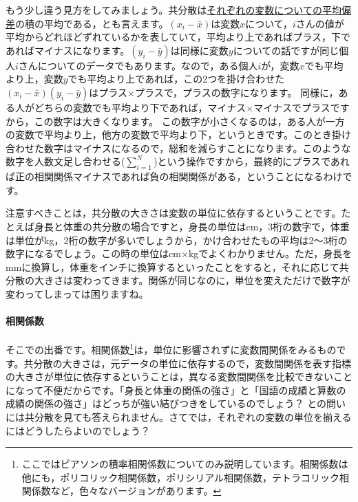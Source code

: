 \documentclass{ltjsbook}
\begin{document}
もう少し違う見方をしてみましょう。共分散は\uline{それぞれの変数についての平均偏差}の積の平均である，とも言えます。$(x_i - \bar{x})$は変数$x$について，$i$さんの値が平均からどれほどずれているかを表していて，平均より上であればプラス，下であればマイナスになります。$(y_i - \bar{y})$は同様に変数$y$についての話ですが同じ個人$i$さんについてのデータでもあります。なので，ある個人$i$が，変数$x$でも平均より上，変数$y$でも平均より上であれば，この2つを掛け合わせた$(x_i - \bar{x})(y_i - \bar{y})$はプラス$\times$プラスで，プラスの数字になります。
同様に，ある人がどちらの変数でも平均より下であれば，マイナス$\times$マイナスでプラスですから，この数字は大きくなります。
この数字が小さくなるのは，ある人が一方の変数で平均より上，他方の変数で平均より下，というときです。このとき掛け合わせた数字はマイナスになるので，総和を減らすことになります。このような数字を人数文足し合わせる($\sum_{i=1}^N$)という操作ですから，最終的にプラスであれば正の相関関係マイナスであれば負の相関関係がある，ということになるわけです。

注意すべきことは，共分散の大きさは変数の単位に依存するということです。たとえば身長と体重の共分散の場合ですと，身長の単位はcm，3桁の数字で，体重は単位がkg，2桁の数字が多いでしょうから，かけ合わせたもの平均は2〜3桁の数字になるでしょう。この時の単位はcm$\times$kgでよくわかりません。ただ，身長をmmに換算し，体重をインチに換算するといったことをすると，それに応じて共分散の大きさは変わってきます。関係が同じなのに，単位を変えただけで数字が変わってしまっては困りますね。

\paragraph{相関係数}そこでの出番です。相関係数\footnote{ここではピアソンの積率相関係数についてのみ説明しています。相関係数は他にも，ポリコリック相関係数，ポリシリアル相関係数，テトラコリック相関係数など，色々なバージョンがあります。}は，単位に影響されずに変数間関係をみるものです。共分散の大きさは，元データの単位に依存するので，変数間関係を表す指標の大きさが単位に依存するということは，異なる変数間関係を比較できないことになって不便だからです。「身長と体重の関係の強さ」と「国語の成績と算数の成績の関係の強さ」はどっちが強い結びつきをしているのでしょう？ との問いには共分散を見ても答えられません。さてでは，それぞれの変数の単位を揃えるにはどうしたらよいのでしょう？ 
\end{document}
